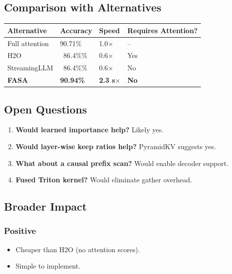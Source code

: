\subsection{Comparison with Alternatives}

\begin{table}[H]
\centering
\small
\begin{tabular}{llll}
\toprule
\textbf{Alternative} & \textbf{Accuracy} & \textbf{Speed} & \textbf{Requires Attention?} \\
\midrule
Full attention & 90.71\% & 1.0$\times$ & -- \\
H2O & ~86.4\%\% & 0.6$\times$ & Yes \\
StreamingLLM & ~86.4\%\% & 0.6$\times$ & No \\
\textbf{FASA} & \textbf{90.94\%} & \textbf{2.3 s$\times$} & \textbf{No} \\
\bottomrule
\end{tabular}
\end{table}

\subsection{Open Questions}

\begin{enumerate}
\item \textbf{Would learned importance help?} Likely yes.
\item \textbf{Would layer-wise keep ratios help?} PyramidKV suggests yes.
\item \textbf{What about a causal prefix scan?} Would enable decoder support.
\item \textbf{Fused Triton kernel?} Would eliminate gather overhead.

\end{enumerate}
\subsection{Broader Impact}

\subsubsection{Positive}

\begin{itemize}
\item Cheaper than H2O (no attention scores).
\item Simple to implement.

\end{itemize}
